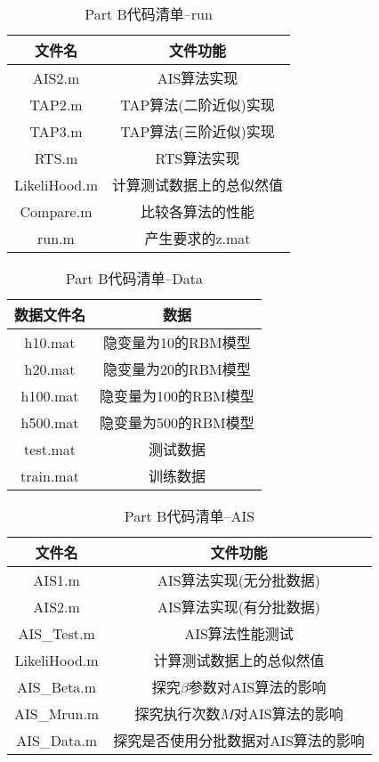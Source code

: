 \documentclass[11pt]{article}
\begin{document}
\begin{table}[!htbp]
  \centering  
  \begin{tabular}{c|c} 
  \hline\hline
  文件名 & 文件功能\\ \hline
  AIS2.m  & AIS算法实现 \\
  TAP2.m & TAP算法(二阶近似)实现\\
  TAP3.m & TAP算法(三阶近似)实现\\
  RTS.m & RTS算法实现 \\
  LikeliHood.m & 计算测试数据上的总似然值 \\
  Compare.m & 比较各算法的性能 \\
  run.m & 产生要求的z.mat \\
  \hline\hline
\end{tabular}
\caption{Part B代码清单--run}
\label{CodeList2-run}
\end{table}


\begin{table}[!htbp]
  \centering  
  \begin{tabular}{c|c} 
  \hline\hline
  数据文件名 & 数据\\ \hline
  h10.mat & 隐变量为10的RBM模型 \\ 
  h20.mat & 隐变量为20的RBM模型 \\
  h100.mat & 隐变量为100的RBM模型 \\
  h500.mat & 隐变量为500的RBM模型 \\ \hline
  test.mat & 测试数据 \\
  train.mat & 训练数据 \\
  \hline\hline
\end{tabular}
\caption{Part B代码清单--Data}
\label{CodeList2-Data}
\end{table}


\begin{table}[!htbp]
  \centering  
  \begin{tabular}{c|c} 
  \hline\hline
  文件名 & 文件功能\\ \hline
  AIS1.m  & AIS算法实现(无分批数据) \\
  AIS2.m  & AIS算法实现(有分批数据) \\ 
  AIS\_Test.m & AIS算法性能测试 \\ \hline
  LikeliHood.m & 计算测试数据上的总似然值 \\ \hline
  AIS\_Beta.m & 探究$\beta$参数对AIS算法的影响\\
  AIS\_Mrun.m & 探究执行次数$M$对AIS算法的影响\\
  AIS\_Data.m & 探究是否使用分批数据对AIS算法的影响\\ 
  \hline\hline
\end{tabular}
\caption{Part B代码清单--AIS}
\label{CodeList2-AIS}
\end{table}
\end{document}
